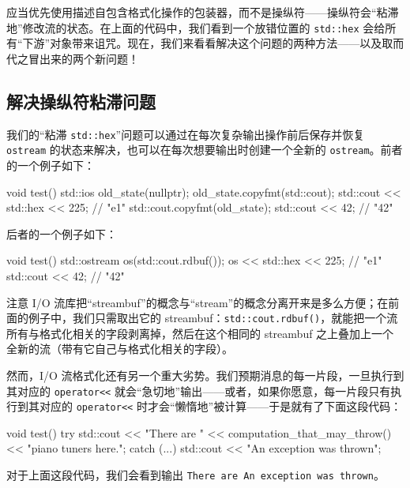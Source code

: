 应当优先使用描述自包含格式化操作的包装器，而不是操纵符——操纵符会“粘滞地”修改流的状态。在上面的代码中，我们看到一个放错位置的 \texttt{std::\allowbreak{}hex} 会给所有“下游”对象带来诅咒。现在，我们来看看解决这个问题的两种方法——以及取而代之冒出来的两个新问题！

\subsection{解决操纵符粘滞问题}

我们的“粘滞 \texttt{std::\allowbreak{}hex}”问题可以通过在每次复杂输出操作前后保存并恢复 \texttt{ostream} 的状态来解决，也可以在每次想要输出时创建一个全新的 \texttt{ostream}。前者的一个例子如下：

\begin{codebox}[cpp]
    void test() {
      std::ios old_state(nullptr);
      old_state.copyfmt(std::cout);
        std::cout << std::hex << 225; // "e1"
      std::cout.copyfmt(old_state);
      std::cout << 42; // "42"
    }
\end{codebox}

后者的一个例子如下：

\begin{codebox}[cpp]
    void test() {
      std::ostream os(std::cout.rdbuf());
      os << std::hex << 225; // "e1"
      std::cout << 42; // "42"
    }
\end{codebox}

注意 I/O 流库把“streambuf”的概念与“stream”的概念分离开来是多么方便；在前面的例子中，我们只需取出它的 streambuf：\texttt{std::\allowbreak{}cout.\allowbreak{}rdbuf(\allowbreak{})\allowbreak{}}，就能把一个流所有与格式化相关的字段剥离掉，然后在这个相同的 streambuf 之上叠加上一个全新的流（带有它自己与格式化相关的字段）。

然而，I/O 流格式化还有另一个重大劣势。我们预期消息的每一片段，一旦执行到其对应的 \texttt{operator<<} 就会“急切地”输出——或者，如果你愿意，每一片段只有执行到其对应的 \texttt{operator<<} 时才会“懒惰地”被计算——于是就有了下面这段代码：

\begin{codebox}[cpp]
    void test() {
      try {
        std::cout << "There are "
                  << computation_that_may_throw()
                  << "piano tuners here.\n";
      } catch (...) {
        std::cout << "An exception was thrown";
      }
    }
\end{codebox}

对于上面这段代码，我们会看到输出 \texttt{There are An exception was thrown}。

